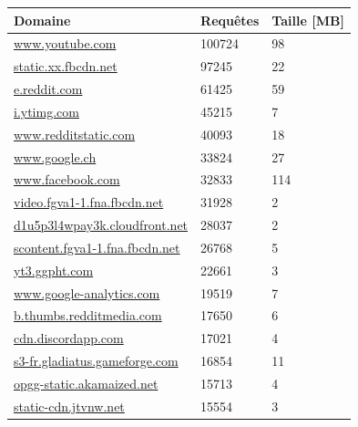 		\begin{table}[]
\centering
\begin{tabular}{lll}
\textbf{Domaine}                     & \textbf{Requêtes} & \textbf{Taille {[}MB{]}} \\ \hline
\scriptsize \url{www.youtube.com}                      & 100724            & 98                       \\
\scriptsize \url{static.xx.fbcdn.net}                  & 97245             & 22                       \\
\scriptsize \url{e.reddit.com}                         & 61425             & 59                       \\
\scriptsize \url{i.ytimg.com}                          & 45215             & 7                        \\
\scriptsize \url{www.redditstatic.com}                 & 40093             & 18                       \\
\scriptsize \url{www.google.ch}                        & 33824             & 27                       \\
\scriptsize \url{www.facebook.com}                     & 32833             & 114                      \\
\scriptsize \url{video.fgva1-1.fna.fbcdn.net}          & 31928             & 2                        \\
\scriptsize \url{d1u5p3l4wpay3k.cloudfront.net}        & 28037             & 2                        \\
\scriptsize \url{scontent.fgva1-1.fna.fbcdn.net}       & 26768             & 5                        \\
\scriptsize \url{yt3.ggpht.com}                        & 22661             & 3                        \\
\scriptsize \url{www.google-analytics.com}             & 19519             & 7                        \\
\scriptsize \url{b.thumbs.redditmedia.com}             & 17650             & 6                        \\
\scriptsize \url{cdn.discordapp.com}                   & 17021             & 4                        \\
\scriptsize \url{s3-fr.gladiatus.gameforge.com}        & 16854             & 11                       \\
\scriptsize \url{opgg-static.akamaized.net}            & 15713             & 4                        \\
\scriptsize \url{static-cdn.jtvnw.net}                 & 15554             & 3                        \\

\end{tabular}
\end{table}
